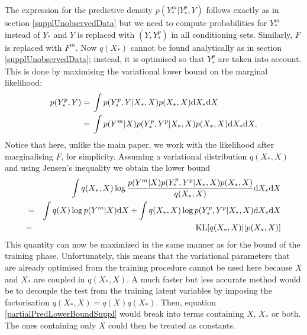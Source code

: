 \documentclass{article} %
\begin{document}
The expression for the predictive density $p(Y_*^m | Y_*^p, Y)$ follows exactly as in section \ref{supplUnobservedData} but we need to compute probabilities for $Y_*^m$ instead of $Y_*$ and $Y$ is replaced with $(Y, Y_*^p)$ in all conditioning sets. Similarly, $F$ is replaced with $F^m$. Now $q(X_*)$ cannot be found analytically as in section \ref{supplUnobservedData}; instead, it is optimised so that $Y_*^p$ are taken into account. 
This is done by maximising the variational lower bound on the marginal likelihood:
\begin{align}
p(Y_*^p, Y) ={}&  \int p(Y_*^p, Y|X_*, X) p(X_*, X) \text{d}  X_* \text{d}  X \nonumber \\
			={}&  \int p(Y^m | X) p(Y_*^p, Y^p|X_*, X) p(X_*, X) \text{d}  X_* \text{d}  X,  \nonumber
\end{align}  
Notice that here, unlike the main paper, we work with the likelihood after marginalising $F$, for simplicity.
Assuming a variational distribution 
$q(X_*, X)$ and using Jensen's inequality we obtain the 
lower bound 
\begin{eqnarray}
& & \int q(X_*, X) \log \frac{ p(Y^m | X) 
p(Y_*^p, Y^p|X_*, X) p(X_*,X)}{ q(X_*, X)} \text{d}  X_* \text{d}  X \nonumber \\ 
& = & \int q(X) \log p(Y^m | X) \text{d}  X 
+  \int q(X_*,X) \log p(Y_*^p, Y^p|X_*, X) \text{d}  X_* \text{d}  X  \nonumber \\
& - & \text{KL}[q(X_*,X) || p(X_*, X)] \label{partialPredLowerBoundSuppl}
\end{eqnarray}  
%
This quantity can now be maximized in the same manner as for the bound
of the training phase. Unfortunately, this means that the variational
parameters that are already optimised from the training procedure
cannot be used here because $X$ and $X_*$ are coupled in $q(X_*,X)$. A
much faster but less accurate method would be to decouple the test
from the training latent variables by imposing the factorisation
$q(X_*, X) = q(X) q(X_*)$. Then, equation
\eqref{partialPredLowerBoundSuppl} would break into terms containing $X$,
$X_*$ or both. The ones containing only $X$ could then be treated as
constants.
\end{document}
